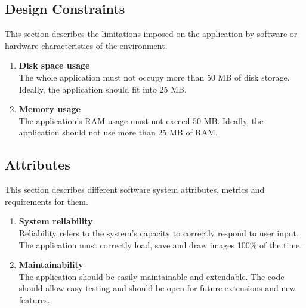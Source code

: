 \documentclass{article}
\begin{document}
\subsection{Design Constraints}
This section describes the limitations imposed on the application by software or hardware characteristics of the environment.
\begin{enumerate}
\item \textbf{Disk space usage}
\\
The whole application must not occupy more than 50 MB of disk storage.
Ideally, the application should fit into 25 MB.
\item \textbf{Memory usage}
\\
The application's RAM usage must not exceed 50 MB.
Ideally, the application should not use more than 25 MB of RAM.
\end{enumerate}

\subsection{Attributes}
This section describes different software system attributes, metrics and requirements for them.
\begin{enumerate}
\item \textbf{ System reliability}
\\
Reliability refers to the system's capacity to correctly respond to user input.
The application must correctly load, save and draw images 100\% of the time.
\item \textbf{Maintainability}
\\
The application should be easily maintainable and extendable.
The code should allow easy testing and should be open for future extensions and new features. 
\end{enumerate}
\end{document}

